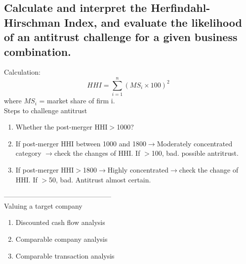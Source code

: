 \documentclass{article}
\newcommand{\be}{\begin{enumerate}}
\newcommand{\ee}{\end{enumerate}}
\newcommand{\ra}{$\rightarrow$}
\begin{document}
\subsection{Calculate and interpret the Herfindahl-Hirschman Index, and evaluate the likelihood
of an antitrust challenge for a given business combination.}
Calculation:
$$
HHI=\sum_{i=1}^n(MS_i\times 100)^2
$$
where $MS_i$ = market share of firm i.
\\Steps to challenge antitrust
\be
    \item Whether the post-merger HHI$>$1000?
    \item If post-merger HHI between 1000 and 1800\ra Moderately concentrated category
        \ra check the changes of HHI. If $>$100, bad. possible antritrust.
    \item If post-merger HHI$>$1800\ra Highly concentrated\ra check the change
        of HHI. If $>$50, bad. Antitrust almost certain.
\ee

-----------------------------------------------
\\Valuing a target company
\be
    \item Discounted cash flow analysis
    \item Comparable company analysis
    \item Comparable transaction analysis
\ee
\end{document}
